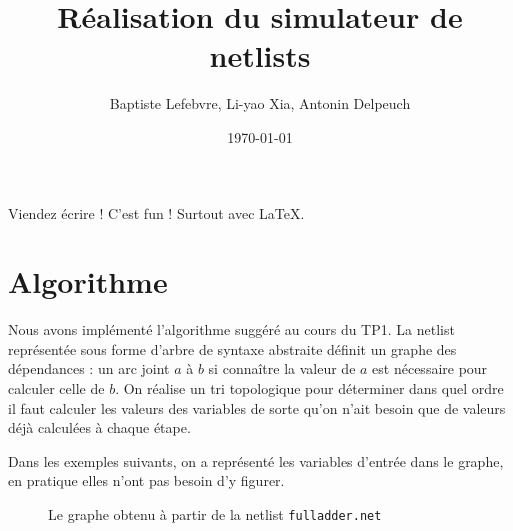 \documentclass[a4paper]{article}
\begin{document}
\title{Réalisation du simulateur de netlists}
\author{Baptiste Lefebvre, Li-yao Xia, Antonin Delpeuch}
\date{\today}

\maketitle

\huge Viendez écrire ! C'est fun ! Surtout avec \LaTeX.
\normalsize

\section{Algorithme}

Nous avons implémenté l'algorithme suggéré au cours du TP1.
La netlist représentée sous forme d'arbre de syntaxe abstraite définit un graphe des dépendances : un arc joint $a$ à $b$ si connaître la valeur de $a$ est nécessaire pour calculer celle de $b$.
On réalise un tri topologique pour déterminer dans quel ordre il faut calculer les valeurs des variables de sorte qu'on n'ait besoin que de valeurs déjà calculées à chaque étape.

Dans les exemples suivants, on a représenté les variables d'entrée dans le graphe, en pratique elles n'ont pas besoin d'y figurer.

\begin{figure}[h]
    \centering
{}
\caption{Le graphe obtenu à partir de la netlist \texttt{fulladder.net}}
\end{figure}
\end{document}
